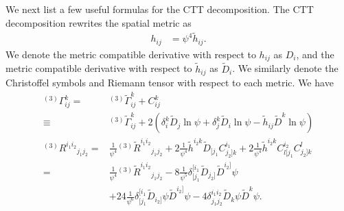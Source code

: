 \documentclass{ws-ijmpd}
\begin{document}
We next list a few useful formulas for the CTT 
decomposition\cite{Gourgoulhon:2007ue,Kovacs:2021lgk}.
The CTT decomposition rewrites the spatial metric as 
\begin{align}
   h_{ij}
   &=
   \psi^4\tilde{h}_{ij}
   .
\end{align}
We denote the metric compatible derivative with respect to $h_{ij}$
as $D_i$, and the metric compatible derivative with respect to
$\tilde{h}_{ij}$ as $\tilde{D}_i$.
We similarly denote the Christoffel symbols and Riemann
tensor with respect to each metric. We have 
\begin{subequations}
\begin{align}
   {}^{(3)}\Gamma^k_{ij}
   =&
   {}^{(3)}\tilde{\Gamma}^k_{ij}
   +
   C^k_{ij}
   \nonumber\\
   \equiv&
   {}^{(3)}\tilde{\Gamma}^k_{ij}
   +
   2
   \left(
      \delta^k_i\tilde{D}_j\ln\psi
      +
      \delta^k_j\tilde{D}_i\ln\psi
      -
      \tilde{h}_{ij}\tilde{D}^k\ln\psi
   \right)
   \\
   {}^{(3)}R^{i_1i_2}{}_{j_1j_2}
   =&
   \frac{1}{\psi^4}{}^{(3)}\tilde{R}^{i_1i_2}{}_{j_1j_2} 
   +
   2\frac{1}{\psi^4}\tilde{h}^{i_2k}\tilde{D}_{[j_1}C^{i_1}_{j_2]k}
   +
   2\frac{1}{\psi^4}\tilde{h}^{i_2k}C^{i_2}_{l[j_1}C^l_{j_2]k}
   \nonumber\\
   =&
   \frac{1}{\psi^4}{}^{(3)}\tilde{R}^{i_1i_2}{}_{j_1j_2} 
   -
   8
   \frac{1}{\psi^5}
   \delta^{[i_1}_{[j_1}\tilde{D}_{j_2]}\tilde{D}^{i_2]}\psi
   \nonumber\\
   &+
   24\frac{1}{\psi^6}\delta^{[i_1}_{[j_1}
   \tilde{D}_{i_2]}\psi\tilde{D}^{i_2]}\psi
   -
   4\delta^{i_1i_2}_{j_1j_2}\tilde{D}_k\psi\tilde{D}^k\psi
   .
\end{align}
\end{subequations}
\end{document}
